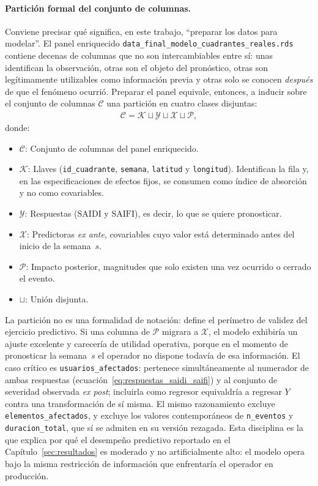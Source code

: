 \paragraph{Partición formal del conjunto de columnas.} Conviene precisar qué significa, en este trabajo, ``preparar los datos para modelar''. El panel enriquecido \texttt{data\_final\_modelo\_cuadrantes\_reales.rds} contiene decenas de columnas que no son intercambiables entre sí: unas identifican la observación, otras son el objeto del pronóstico, otras son legítimamente utilizables como información previa y otras solo se conocen \emph{después} de que el fenómeno ocurrió. Preparar el panel equivale, entonces, a inducir sobre el conjunto de columnas $\mathcal{C}$ una partición en cuatro clases disjuntas:
\begin{equation}
    \begin{aligned}
    \mathcal{C} = \mathcal{K} \sqcup \mathcal{Y} \sqcup \mathcal{X} \sqcup \mathcal{P},
    \end{aligned}
    \label{eq:particion_columnas}
\end{equation}
donde:
\begin{itemize}
    \item $\mathcal{C}$: Conjunto de columnas del panel enriquecido.
    \item $\mathcal{K}$: Llaves (\texttt{id\_cuadrante}, \texttt{semana}, \texttt{latitud} y \texttt{longitud}). Identifican la fila y, en las especificaciones de efectos fijos, se consumen como índice de absorción y no como covariables.
    \item $\mathcal{Y}$: Respuestas ($\mathrm{SAIDI}$ y $\mathrm{SAIFI}$), es decir, lo que se quiere pronosticar.
    \item $\mathcal{X}$: Predictoras \emph{ex ante}, covariables cuyo valor está determinado antes del inicio de la semana~$s$.
    \item $\mathcal{P}$: Impacto posterior, magnitudes que solo existen una vez ocurrido o cerrado el evento.
    \item $\sqcup$: Unión disjunta.
\end{itemize}

La partición no es una formalidad de notación: define el perímetro de validez del ejercicio predictivo. Si una columna de $\mathcal{P}$ migrara a $\mathcal{X}$, el modelo exhibiría un ajuste excelente y carecería de utilidad operativa, porque en el momento de pronosticar la semana~$s$ el operador no dispone todavía de esa información. El caso crítico es \texttt{usuarios\_afectados}: pertenece simultáneamente al numerador de ambas respuestas (ecuación~\eqref{eq:respuestas_saidi_saifi}) y al conjunto de severidad observada \emph{ex post}; incluirla como regresor equivaldría a regresar $Y$ contra una transformación de sí misma. El mismo razonamiento excluye \texttt{elementos\_afectados}, y excluye los valores contemporáneos de \texttt{n\_eventos} y \texttt{duracion\_total}, que sí se admiten en su versión rezagada. Esta disciplina es la que explica por qué el desempeño predictivo reportado en el Capítulo~\ref{sec:resultados} es moderado y no artificialmente alto: el modelo opera bajo la misma restricción de información que enfrentaría el operador en producción.

